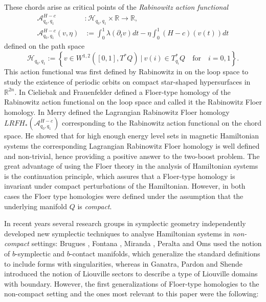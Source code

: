 \documentclass[a4paper]{amsart}
\numberwithin{equation}{section}
\newcommand{\R}{\mathbb{R}}
\newcommand{\A}{\mathcal{A}}
\begin{document}
These chords arise as critical points of the \emph{Rabinowitz action functional}
\begin{align*}
\A^{H-c}_{q_0,q_1} & : \mathscr{H}_{q_0,q_1}\times \R \to \R,\\
\A^{H-c}_{q_0,q_1}(v,\eta) & := \int_0^1 \lambda(\partial_t v)dt - \eta \int_0^1 (H-c)(v(t))dt
\end{align*}
defined on the path space
$$
\mathscr{H}_{q_0,q_1}:= \left\lbrace v \in W^{1,2}([0,1], T^*Q)\ \big|\ v(i)\in T^*_{q_i}Q\quad \textrm{for}\quad i=0,1\right\rbrace.
$$
This action functional was first defined by Rabinowitz in \cite{Rabinowitz1978} on the loop space to study the existence of periodic orbits on compact star-shaped hypersurfaces in $\R^{2n}$. In \cite{CieliebakFrauenfelder2009} Cieliebak and Frauenfelder defined a Floer-type homology of the Rabinowitz action functional on the loop space and called it the Rabinowitz Floer homology. In \cite{Merry2014} Merry
defined the Lagrangian Rabinowitz Floer homology $LRFH_*\left(\A^{H-c}_{q_0,q_1} \right)$ corresponding to the Rabinowitz action functional on the chord space. He showed that for high enough energy level sets in magnetic Hamiltonian systems the corresponding Lagrangian Rabinowitz Floer homology is well defined and non-trivial, hence providing a positive answer to the two-boost problem. The great advantage of using the Floer theory in the analysis of Hamiltonian systems is the continuation principle, which assures that a Floer-type homology is invariant under compact perturbations of the Hamiltonian. 
However, in both cases the Floer type homologies were defined under the assumption that the underlying manifold $Q$ is \emph{compact}.

In recent years several research groups in symplectic geometry independently developed new symplectic techniques to analyse Hamiltonian systems in \emph{non-compact} settings: Brugues \cite{Brugues2024}, Fontana \cite{Fontana2023}, Miranda \cite{Brugues2024, Fontana2023, Oms2021}, Peralta \cite{Fontana2023} and Oms \cite{Brugues2024, Fontana2023, Oms2021}\linebreak used the notion of $b$-symplectic and $b$-contact manifolds, which generalize the standard definitions to include forms with singularities, whereas in \cite{Ganatra2020} Ganatra, Pardon and Shende introduced the notion of Liouville sectors to describe a type of Liouville domains with boundary. However, the first generalizations of Floer-type homologies to the non-compact setting and the ones most relevant to this paper were the following: 
\end{document}
